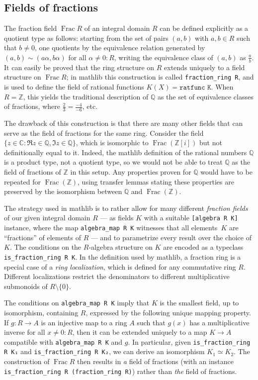 \documentclass[sn-mathphys]{sn-jnl}%
\renewcommand{\C}{\mathbb{C}}
\newcommand{\lean}[1]{\texttt{#1}\xspace}
\newcommand{\mathlib}{\textsf{mathlib}\xspace}
\newcommand{\QQ}{\mathbb{Q}}
\renewcommand{\Z}{\mathbb{Z}}
\DeclareMathOperator{\Frac}{Frac}
\begin{document}
\subsection{Fields of fractions}\label{subsection : fields of fractions}
The fraction field $\Frac R$ of an integral domain $R$ can be defined explicitly as a quotient type as follows:
starting from the set of pairs $(a,b)$ with $a,b \in R$ such that $b\neq 0$,
one quotients by the equivalence relation generated by $(a,b) \sim (a \alpha, b \alpha)$ for all $\alpha \ne 0 : R$, writing the equivalence class of $(a,b)$ as $\frac{a}{b}$.
It can easily be proved that the ring structure on $R$ extends uniquely to a field structure on $\Frac R$;
in \mathlib this construction is called \mbox{\lean{fraction\_ring R}},
and is used to define the field of rational functions $K(X) = \lean{ratfunc K}$.
When $R=\Z$, this yields the traditional description of $\QQ$ as the set of equivalence classes of fractions, where $\frac{2}{3}=\frac{-4}{-6}$, etc.

The drawback of this construction is that there are many other fields that can serve as the field of fractions for the same ring.
Consider the field $\{z \in \C : \Re z \in \QQ, \Im z\in\QQ\}$, which is isomorphic to $\Frac (\Z[i])$ but not definitionally equal to it.
Indeed, the \mathlib definition of the rational numbers $\QQ$ is a product type, not a quotient type, so we would not be able to treat $\QQ$ as the field of fractions of $\Z$ in this setup.
Any properties proven for $\QQ$ would have to be repeated for $\Frac(\Z)$,
using transfer lemmas stating these properties are preserved by the isomorphism between $\QQ$ and $\Frac(\Z)$.

The strategy used in \mathlib is to rather allow for many different \emph{fraction fields} of our given integral domain $R$ --- as fields $K$ with a suitable \lean{[algebra R K]} instance, where the map \lean{algebra\_map R K} witnesses that all elements~$K$ are ``fractions'' of elements of $R$ --- and to parametrize every result over the choice of $K$.
The conditions on the $R$-algebra structure on $K$ are encoded as a typeclass \lean{is\_fraction\_ring R K}.
In the definition used by \mathlib, a fraction ring is a special case of a \emph{ring localization},
which is defined for any commutative ring $R$.
Different localizations restrict the denominators to different multiplicative submonoids of $R\setminus\{0\}$.

The conditions on \lean{algebra\_map R K} imply that $K$ is the smallest field, up to isomorphism, containing $R$, expressed by the following unique mapping property.
If $g \colon R \to A$ is an injective map to a ring $A$ such that $g(x)$ has a multiplicative inverse for all $x \ne 0 : R$, then
it can be extended uniquely to a map $K \to A$ compatible with \lean{algebra\_map R K} and $g$.
In particular, given \lean{is\_fraction\_ring R K₁} and \lean{is\_fraction\_ring R K₂}, we can derive an isomorphism $K_1 \simeq K_2$.
The construction of $\Frac R$ then results in \emph{a} field of fractions (with an instance \lean{is\_fraction\_ring R (fraction\_ring R)}) rather than \emph{the} field of fractions.
\end{document}
